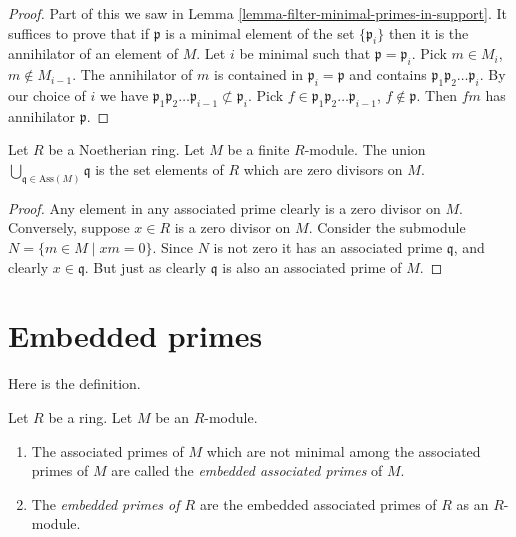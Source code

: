 \begin{proof}
Part of this we saw in Lemma \ref{lemma-filter-minimal-primes-in-support}.
It suffices to prove that if $\mathfrak p$ is a minimal element of
the set $\{\mathfrak p_i\}$ then it is the annihilator of
an element of $M$. Let $i$ be minimal such that
$\mathfrak p = \mathfrak p_i$.
Pick $m \in M_i$, $m \not \in M_{i-1}$. The annihilator of $m$
is contained in $\mathfrak p_i = \mathfrak p$ and contains
$\mathfrak p_1 \mathfrak p_2 \ldots \mathfrak p_i$. By our choice of
$i$ we have $\mathfrak p_1 \mathfrak p_2 \ldots \mathfrak p_{i-1}
\not \subset \mathfrak p_i$. Pick
$f \in \mathfrak p_1 \mathfrak p_2 \ldots \mathfrak p_{i-1}$,
$f \not \in \mathfrak p$. Then $fm$ has annihilator $\mathfrak p$.
\end{proof}

\begin{lemma}
\label{lemma-ass-zero-divisors}
Let $R$ be a Noetherian ring.
Let $M$ be a finite $R$-module.
The union $\bigcup_{\mathfrak q \in \text{Ass}(M)} \mathfrak q$
is the set elements of $R$ which are zero divisors on $M$.
\end{lemma}

\begin{proof}
Any element in any associated prime clearly is a zero divisor
on $M$. Conversely, suppose $x \in R$ is a zero divisor on $M$.
Consider the submodule $N = \{m \in M \mid xm = 0\}$.
Since $N$ is not zero it has an associated prime $\mathfrak q$,
and clearly $x \in \mathfrak q$. But just as clearly $\mathfrak q$
is also an associated prime of $M$.
\end{proof}















\section{Embedded primes}
\label{section-embedded-primes}

\noindent
Here is the definition.

\begin{definition}
\label{definition-embedded-primes}
Let $R$ be a ring.
Let $M$ be an $R$-module.
\begin{enumerate}
\item  The associated primes of $M$ which are
not minimal among the associated primes of $M$ are called the
{\it embedded associated primes} of $M$.
\item The {\it embedded primes of $R$}
are the embedded associated primes of $R$ as an $R$-module.
\end{enumerate}
\end{definition}

